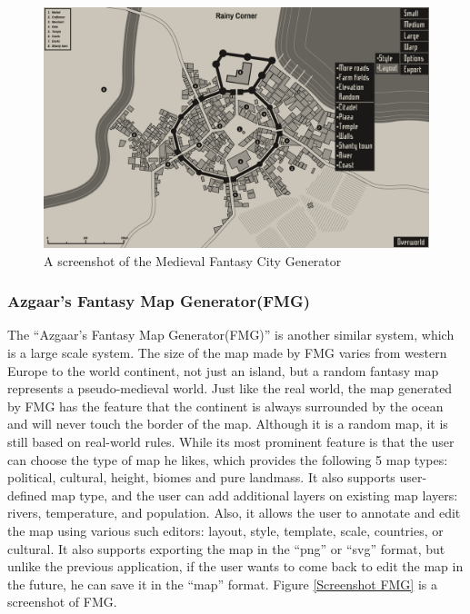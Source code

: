 \begin{figure}[htb]
\centering
\includegraphics[width=\textwidth]{section01/assets/screenshot_MFCG.png}
\caption[A screenshot of the Medieval Fantasy City Generator]{\label{Screenshot MFCG}A screenshot of the Medieval Fantasy City Generator}
\end{figure}

\subsubsection{Azgaar's Fantasy Map Generator(FMG)}
The ``Azgaar's Fantasy Map Generator(FMG)'' is another similar system, which is a large scale system. The size of the map made by FMG varies from western Europe to the world continent, not just an island, but a random fantasy map represents a pseudo-medieval world. Just like the real world, the map generated by FMG has the feature that the continent is always surrounded by the ocean and will never touch the border of the map. Although it is a random map, it is still based on real-world rules. While its most prominent feature is that the user can choose the type of map he likes, which provides the following 5 map types: political, cultural, height, biomes and pure landmass. It also supports user-defined map type, and the user can add additional layers on existing map layers: rivers, temperature, and population. Also, it allows the user to annotate and edit the map using various such editors: layout, style, template, scale, countries, or cultural. It also supports exporting the map in the ``png'' or ``svg'' format, but unlike the previous application, if the user wants to come back to edit the map in the future, he can save it in the ``map'' format. Figure \ref{Screenshot FMG} is a screenshot of FMG.

